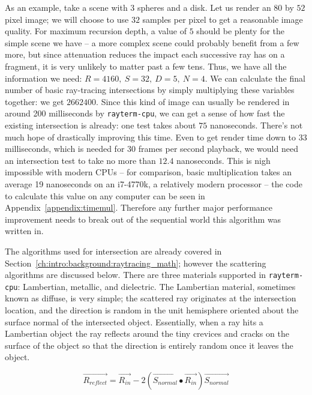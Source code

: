 As an example, take a scene with $3$ spheres and a disk.
Let us render an $80$ by $52$ pixel image;
we will choose to use $32$ samples per pixel to get a reasonable image quality.
For maximum recursion depth, a value of $5$ should be plenty for the simple scene we have -- a more complex scene could probably benefit from a few more, but since attenuation reduces the impact each successive ray has on a fragment, it is very unlikely to matter past a few tens.
Thus, we have all the information we need: $R = 4160,\ S = 32,\ D = 5,\ N = 4$.
We can calculate the final number of basic ray-tracing intersections by simply multiplying these variables together: we get $2662400$.
Since this kind of image can usually be rendered in around 200 milliseconds by \texttt{rayterm-cpu}, we can get a sense of how fast the existing intersection is already: one test takes about $75$ nanoseconds.
There's not much hope of drastically improving this time.
Even to get render time down to $33$ milliseconds, which is needed for $30$ frames per second playback, we would need an intersection test to take no more than $12.4$ nanoseconds.
This is nigh impossible with modern CPUs -- for comparison, basic multiplication takes an average 19 nanoseconds on an i7-4770k, a relatively modern processor -- the code to calculate this value on any computer can be seen in Appendix~\ref{appendix:timemul}.
Therefore any further major performance improvement needs to break out of the sequential world this algorithm was written in.

The algorithms used for intersection are already covered in Section~\ref{ch:intro:background:raytracing_math}; however the scattering algorithms are discussed below.
There are three materials supported in \texttt{rayterm-cpu}: Lambertian, metallic, and dielectric.
The Lambertian material, sometimes known as diffuse, is very simple; the scattered ray originates at the intersection location, and the direction is random in the unit hemisphere oriented about the surface normal of the intersected object.
Essentially, when a ray hits a Lambertian object the ray reflects around the tiny crevices and cracks on the surface of the object so that the direction is entirely random once it leaves the object.

\begin{equation}
\label{equation:reflection}
  \vec{R_{reflect}} = \vec{R_{in}} - 2(\vec{S_{normal}} \bullet \vec{R_{in}})\vec{S_{normal}}
\end{equation}


